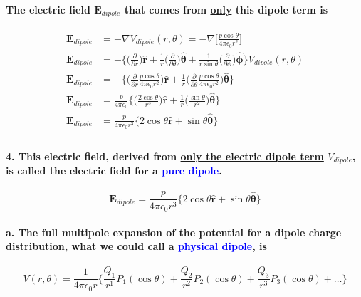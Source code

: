 \documentclass{article}
\begin{document}
\paragraph{\indent The electric field $\boldsymbol{E}_{dipole}$ that comes from \underline{only} this dipole term is}
\begin{align*}
    \boldsymbol{E}_{dipole}&=-\nabla V_{dipole}(r,\theta)=-\nabla \Bigg[\frac{p\cos\theta}{4\pi\epsilon_0r^2}\Bigg]\\
    \boldsymbol{E}_{dipole}&=-\bigg\{ \bigg( \frac{\partial}{\partial r}\bigg) \hat{\boldsymbol{r}}+\frac{1}{r}\bigg(\frac{\partial}{\partial \theta}\bigg)\hat{\boldsymbol{\theta}}+\frac{1}{r\sin\theta}\bigg(\frac{\partial}{\partial \phi}\bigg)\hat{\boldsymbol{\phi}}\bigg\}V_{dipole}(r,\theta)    \\
    \boldsymbol{E}_{dipole}&=-\bigg\{\bigg(\frac{\partial}{\partial r}\frac{p\cos\theta}{4\pi\epsilon_0r^2}\bigg)\hat{\boldsymbol{r}} +\frac{1}{r}\bigg(\frac{\partial}{\partial \theta}\frac{p\cos\theta}{4\pi\epsilon_0r^2}\bigg)\hat{\boldsymbol{\theta}}\bigg\}   \\
    \boldsymbol{E}_{dipole}&=\frac{p}{4\pi\epsilon_0}\bigg\{ \bigg(\frac{2\cos\theta}{r^3}\bigg)\hat{\boldsymbol{r}}+\frac{1}{r}\bigg( \frac{\sin\theta}{r^2}\bigg)\hat{\boldsymbol{\theta}}\bigg\}  \\
    \boldsymbol{E}_{dipole}&=\frac{p}{4\pi\epsilon_0r^3}\{ 2\cos\theta\hat{\boldsymbol{r}}+\sin\theta\hat{\boldsymbol{\theta}}\} \\
\end{align*}
\paragraph{4. This electric field, derived from \underline{only the electric dipole term} $V_{dipole}$, is called the electric field for a \textcolor{blue}{pure dipole}.}
\begin{equation*}
    \boldsymbol{E}_{dipole}=\frac{p}{4\pi\epsilon_0r^3}\{ 2\cos\theta\hat{\boldsymbol{r}}+\sin\theta\hat{\boldsymbol{\theta}}\}
\end{equation*}
\paragraph{\indent a. The full multipole expansion of the potential for a dipole charge distribution, what we could call a \textcolor{blue}{physical dipole}, is }
\begin{equation*}
    V(r,\theta)=\frac{1}{4\pi\epsilon_0r}\bigg\{ \frac{Q_1}{r^1}P_1(\cos\theta)+\frac{Q_2}{r^2}P_2(\cos\theta)+\frac{Q_3}{r^3}P_3(\cos\theta)+\dots\bigg\}
\end{equation*}
\end{document}
